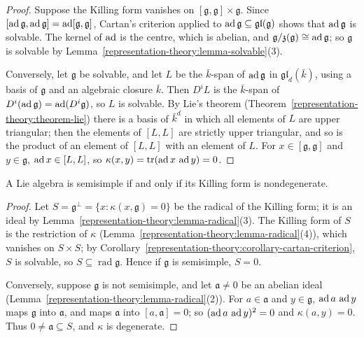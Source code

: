 \begin{proof}
Suppose the Killing form vanishes on $[\mathfrak{g}, \mathfrak{g}] \times \mathfrak{g}$. Since $[\operatorname{ad}\mathfrak{g}, \operatorname{ad}\mathfrak{g}] = \operatorname{ad}[\mathfrak{g}, \mathfrak{g}]$, Cartan's
criterion applied to $\operatorname{ad}\mathfrak{g} \subseteq \mathfrak{gl}(\mathfrak{g})$ shows that $\operatorname{ad}\mathfrak{g}$ is solvable. The kernel of $\operatorname{ad}$ is the centre, which is abelian, and
$\mathfrak{g}/\mathfrak{z}(\mathfrak{g}) \cong \operatorname{ad}\mathfrak{g}$; so $\mathfrak{g}$ is solvable by Lemma~\ref{representation-theory:lemma-solvable}(3).

Conversely, let $\mathfrak{g}$ be solvable, and let $L$ be the $\bar k$-span of $\operatorname{ad}\mathfrak{g}$ in $\mathfrak{gl}_d(\bar k)$, using a basis of $\mathfrak{g}$ and an algebraic closure
$\bar k$. Then $D^iL$ is the $\bar k$-span of $D^i(\operatorname{ad}\mathfrak{g}) = \operatorname{ad}(D^i\mathfrak{g})$, so $L$ is solvable. By Lie's theorem
(Theorem~\ref{representation-theory:theorem-lie}) there is a basis of $\bar k^d$ in which all elements of $L$ are upper triangular; then the elements of $[L, L]$ are strictly
upper triangular, and so is the product of an element of $[L, L]$ with an element of $L$. For $x \in [\mathfrak{g}, \mathfrak{g}]$ and $y \in \mathfrak{g}$,
$\operatorname{ad} x \in [L, L]$, so $\kappa(x, y) = \operatorname{tr}(\operatorname{ad} x\,\operatorname{ad} y) = 0$.
\end{proof}

\begin{theorem}\label{representation-theory:theorem-killing-criterion}
A Lie algebra is semisimple if and only if its Killing form is nondegenerate.
\end{theorem}

\begin{proof}
Let $S = \mathfrak{g}^\perp = \{x : \kappa(x, \mathfrak{g}) = 0\}$ be the radical of the Killing form; it is an ideal by Lemma~\ref{representation-theory:lemma-radical}(3). The
Killing form of $S$ is the restriction of $\kappa$ (Lemma~\ref{representation-theory:lemma-radical}(4)), which vanishes on $S \times S$; by
Corollary~\ref{representation-theory:corollary-cartan-criterion}, $S$ is solvable, so $S \subseteq \operatorname{rad}\mathfrak{g}$. Hence if $\mathfrak{g}$ is semisimple, $S = 0$.

Conversely, suppose $\mathfrak{g}$ is not semisimple, and let $\mathfrak{a} \neq 0$ be an abelian ideal (Lemma~\ref{representation-theory:lemma-radical}(2)). For $a \in \mathfrak{a}$
and $y \in \mathfrak{g}$, $\operatorname{ad} a\,\operatorname{ad} y$ maps $\mathfrak{g}$ into $\mathfrak{a}$, and maps $\mathfrak{a}$ into $[a, \mathfrak{a}] = 0$; so $(\operatorname{ad} a\,\operatorname{ad} y)^2 = 0$ and
$\kappa(a, y) = 0$. Thus $0 \neq \mathfrak{a} \subseteq S$, and $\kappa$ is degenerate.
\end{proof}

